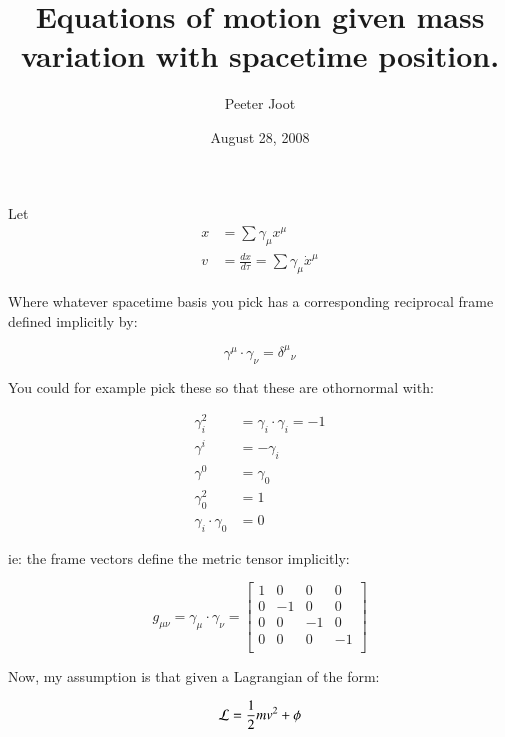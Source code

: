\documentclass{article}      %
\title{ Equations of motion given mass variation with spacetime position. } %
\author{Peeter Joot}         %
\date{August 28, 2008}        %
\newcommand{\LL}[0]{\mathcal{L}}
\newcommand{\xdot}[0]{\dot{x}}
\begin{document}

\maketitle{}

\section{}

Let
\begin{align*}
x &= \sum \gamma_{\mu} {x}^{\mu} \\
v &= \frac{dx}{d\tau} = \sum \gamma_{\mu} \xdot^{\mu}
\end{align*}

Where whatever spacetime basis you pick has a corresponding reciprocal frame defined implicitly by:

\begin{equation*}
\gamma^{\mu} \cdot \gamma_{\nu} = {\delta^{\mu}}_{\nu}
\end{equation*}

You could for example pick these so that these are othornormal with:

\begin{align*}
\gamma_{i}^2 &= \gamma_i \cdot \gamma_i = -1 \\
\gamma^{i} &= -\gamma_{i} \\
\gamma^{0} &= \gamma_{0} \\
\gamma_{0}^2 &= 1 \\
\gamma_{i} \cdot \gamma_0 &= 0
\end{align*}

ie: the frame vectors define the metric tensor implicitly:

\begin{equation}\label{eqn:minkowski}
g_{\mu\nu} = \gamma_{\mu} \cdot \gamma_{\nu} =
\begin{bmatrix}
1 & 0 & 0 & 0 \\
0 & -1 & 0 & 0 \\
0 & 0 & -1 & 0 \\
0 & 0 & 0 & -1 \\
\end{bmatrix}
\end{equation}

Now, my assumption is that given a Lagrangian of the form:

\begin{equation}
\LL = \inv{2} m v^2 + \phi
\end{equation}
\end{document}
